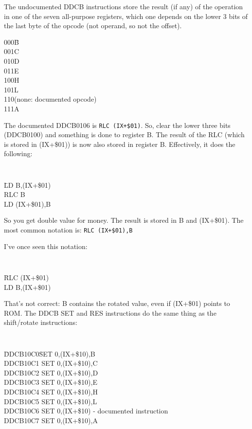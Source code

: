 \documentclass[12pt,twoside,openright,a4paper]{book}
\begin{document}
The undocumented DDCB instructions store the result (if any) of the operation in one of the seven all-purpose registers, which one depends on the lower 3 bits of the last byte of the opcode (not operand, so not the offset).

\begin{tabbing}
	{\qquad}000\quad\=B\\
	{\qquad}001\>C\\
	{\qquad}010\>D\\
	{\qquad}011\>E\\
	{\qquad}100\>H\\
	{\qquad}101\>L\\
	{\qquad}110\>(none: documented opcode)\\
	{\qquad}111\>A
\end{tabbing}

The documented DDCB0106 is {\tt RLC (IX+\$01)}. So, clear the lower three bits (DDCB0100) and something is done to register B. The result of the RLC (which is stored in (IX+\$01)) is now also stored in register B. Effectively, it does the following:

{\tt 
	\begin{tabbing}
		{\qquad}\=LD B,(IX+\$01)\+\\
		RLC B\\
		LD (IX+\$01),B
	\end{tabbing}
}

So you get double value for money. The result is stored in B and (IX+\$01). The most common notation is: {\tt RLC (IX+\$01),B}

I've once seen this notation:
 
{\tt 
	\begin{tabbing}
		{\qquad}\=RLC (IX+\$01)\+\\
		LD B,(IX+\$01)
	\end{tabbing}
}

That's not correct: B contains the rotated value, even if (IX+\$01) points to ROM. The DDCB SET and RES instructions do the same thing as the shift/rotate instructions:

{\tt 
	\begin{tabbing}
		{\qquad}\=DDCB10C0{\qquad}\=SET 0,(IX+\$10),B\+\\
		DDCB10C1	\>SET 0,(IX+\$10),C\\
		DDCB10C2	\>SET 0,(IX+\$10),D\\
		DDCB10C3	\>SET 0,(IX+\$10),E\\
		DDCB10C4	\>SET 0,(IX+\$10),H\\
		DDCB10C5	\>SET 0,(IX+\$10),L\\
		DDCB10C6	\>SET 0,(IX+\$10) {\rm - documented instruction}\\
		DDCB10C7	\>SET 0,(IX+\$10),A
	\end{tabbing}
}
\end{document}
